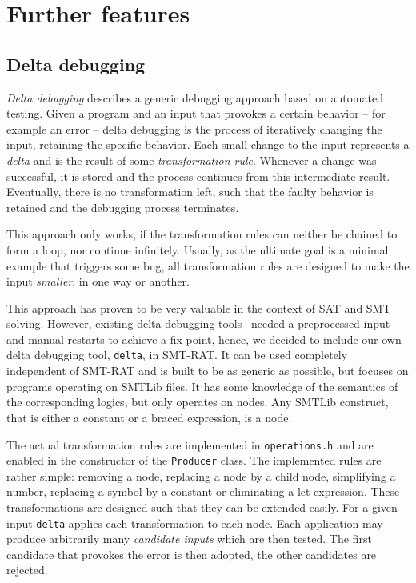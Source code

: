 \chapter{Further features}
\label{chapter:further_features}

\section{Delta debugging}
\emph{Delta debugging} describes a generic debugging approach based on automated testing.
Given a program and an input that provokes a certain behavior -- for example an error -- delta debugging is the process of iteratively changing the input, retaining the specific behavior.
Each small change to the input represents a \emph{delta} and is the result of some \emph{transformation rule}.
Whenever a change was successful, it is stored and the process continues from this intermediate result.
Eventually, there is no transformation left, such that the faulty behavior is retained and the debugging process terminates.

This approach only works, if the transformation rules can neither be chained to form a loop, nor continue infinitely.
Usually, as the ultimate goal is a minimal example that triggers some bug, all transformation rules are designed to make the input \emph{smaller}, in one way or another.

This approach has proven to be very valuable in the context of SAT and SMT solving. However, existing delta debugging tools~\cite{Niemetz2013ddsmt} needed a preprocessed input and manual restarts to achieve a fix-point, hence, we decided to include our own delta debugging tool, \texttt{delta}, in SMT-RAT. It can be used completely independent of SMT-RAT and is built to be as generic as possible, but focuses on programs operating on SMTLib files.
It has some knowledge of the semantics of the corresponding logics, but only operates on nodes. Any SMTLib construct, that is either a constant or a braced expression, is a node.

The actual transformation rules are implemented in \texttt{operations.h} and are enabled in the constructor of the \texttt{Producer} class.
The implemented rules are rather simple: removing a node, replacing a node by a child node, simplifying a number, replacing a symbol by a constant or eliminating a let expression.
These transformations are designed such that they can be extended easily.
For a given input \texttt{delta} applies each transformation to each node.
Each application may produce arbitrarily many \emph{candidate inputs} which are then tested. The first candidate that provokes the error is then adopted, the other candidates are rejected.

